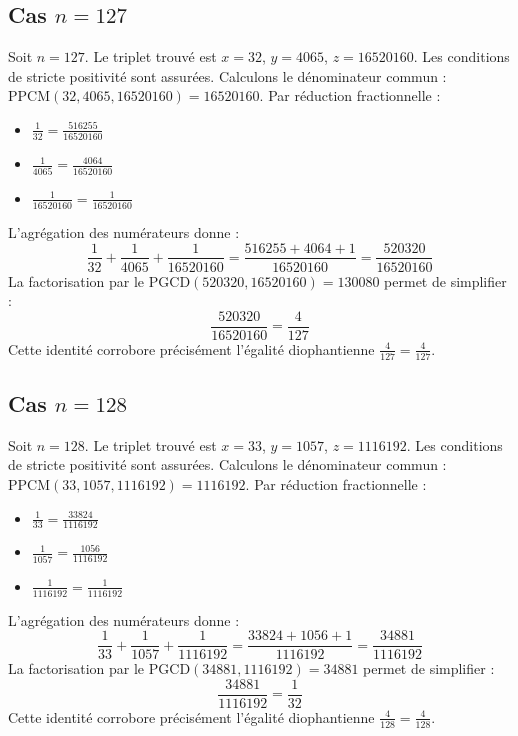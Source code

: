 \documentclass[11pt,a4paper]{article}
\begin{document}
\subsection{Cas $n = 127$}
Soit $n = 127$. Le triplet trouvé est $x = 32$, $y = 4065$, $z = 16520160$.
Les conditions de stricte positivité sont assurées.
Calculons le dénominateur commun : $\text{PPCM}(32, 4065, 16520160) = 16520160$.
Par réduction fractionnelle :
\begin{itemize}
    \item $\frac{1}{32} = \frac{516255}{16520160}$
    \item $\frac{1}{4065} = \frac{4064}{16520160}$
    \item $\frac{1}{16520160} = \frac{1}{16520160}$
\end{itemize}
L'agrégation des numérateurs donne :
$$ \frac{1}{32} + \frac{1}{4065} + \frac{1}{16520160} = \frac{516255 + 4064 + 1}{16520160} = \frac{520320}{16520160} $$
La factorisation par le $\text{PGCD}(520320, 16520160) = 130080$ permet de simplifier :
$$ \frac{520320}{16520160} = \frac{4}{127} $$
Cette identité corrobore précisément l'égalité diophantienne $\frac{4}{127} = \frac{4}{127}$.

\subsection{Cas $n = 128$}
Soit $n = 128$. Le triplet trouvé est $x = 33$, $y = 1057$, $z = 1116192$.
Les conditions de stricte positivité sont assurées.
Calculons le dénominateur commun : $\text{PPCM}(33, 1057, 1116192) = 1116192$.
Par réduction fractionnelle :
\begin{itemize}
    \item $\frac{1}{33} = \frac{33824}{1116192}$
    \item $\frac{1}{1057} = \frac{1056}{1116192}$
    \item $\frac{1}{1116192} = \frac{1}{1116192}$
\end{itemize}
L'agrégation des numérateurs donne :
$$ \frac{1}{33} + \frac{1}{1057} + \frac{1}{1116192} = \frac{33824 + 1056 + 1}{1116192} = \frac{34881}{1116192} $$
La factorisation par le $\text{PGCD}(34881, 1116192) = 34881$ permet de simplifier :
$$ \frac{34881}{1116192} = \frac{1}{32} $$
Cette identité corrobore précisément l'égalité diophantienne $\frac{4}{128} = \frac{4}{128}$.
\end{document}
